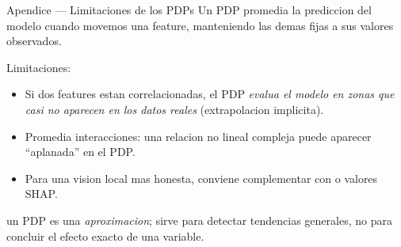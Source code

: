 \begin{frame}{Apendice — Limitaciones de los PDPs}
Un PDP promedia la prediccion del modelo cuando movemos una feature, manteniendo las demas fijas a sus valores observados.

\vspace{0.3em}
Limitaciones:
\begin{itemize}\small
  \item Si dos features estan correlacionadas, el PDP \emph{evalua el modelo en zonas que casi no aparecen en los datos reales} (extrapolacion implicita).
  \item Promedia interacciones: una relacion no lineal compleja puede aparecer ``aplanada'' en el PDP.
  \item Para una vision local mas honesta, conviene complementar con  o valores SHAP.
\end{itemize}

\vspace{0.3em}
 un PDP es una \emph{aproximacion}; sirve para detectar tendencias generales, no para concluir el efecto exacto de una variable.
\end{frame}
